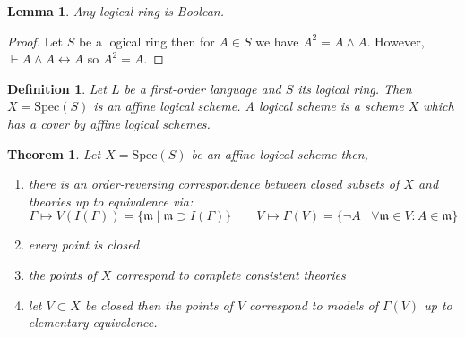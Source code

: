 \documentclass{article}
\newcommand{\lra}{\leftrightarrow}
\newcommand{\proves}{\vdash}
\newcommand{\m}{\mathfrak{m}}
\newcommand{\Spec}[1]{\mathrm{Spec}(#1)}
\newtheorem{lemma}{Lemma}
\newtheorem{thm}{Theorem}
\theoremstyle{plain}
\newtheorem{defn}{Definition}
\begin{document}
\begin{lemma}
Any logical ring is Boolean. 
\end{lemma}

\begin{proof}
Let $S$ be a logical ring then for $A \in S$ we have $A^2 = A \wedge A$. However, $\proves A \wedge A \lra A$ so $A^2 = A$.
\end{proof}

\begin{defn}
Let $L$ be a first-order language and $S$ its logical ring. Then $X = \Spec{S}$ is an \textit{affine logical scheme}. A \textit{logical scheme} is a scheme $X$ which has a cover by affine logical schemes. 
\end{defn}

\begin{thm}
Let $X = \Spec{S}$ be an affine logical scheme then,
\begin{enumerate}
\item there is an order-reversing correspondence between closed subsets of $X$ and theories up to equivalence via:
\[ \Gamma \mapsto V(I(\Gamma)) = \{ \m \mid \m \supset I(\Gamma) \} \quad \quad V \mapsto \Gamma(V) = \{ \neg A \mid \forall \m \in V : A \in \m \} \]
\item every point is closed
\item the points of $X$ correspond to complete consistent theories
\item let $V \subset X$ be closed then the points of $V$ correspond to models of $\Gamma(V)$ up to elementary equivalence. 
\end{enumerate}
\end{thm}
\end{document}
